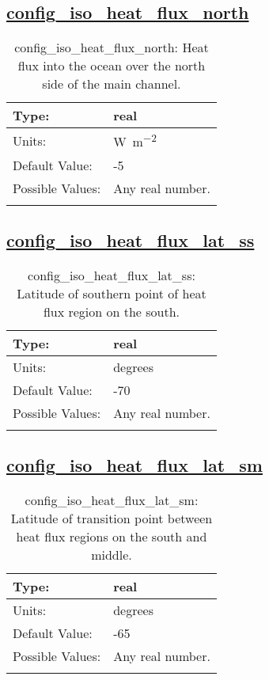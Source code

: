 \subsection[config\_iso\_heat\_flux\_north]{\hyperref[sec:nm_tab_iso]{config\_iso\_heat\_flux\_north}}
\label{subsec:nm_sec_config_iso_heat_flux_north}
\begin{center}
\begin{longtable}{| p{2.0in} || p{4.0in} |}
    \hline
    Type: & real \\
    \hline
    Units: & \si{W.m^{-2}} \\
    \hline
    Default Value: & -5 \\
    \hline
    Possible Values: & Any real number. \\
    \hline
    \caption{config\_iso\_heat\_flux\_north: Heat flux into the ocean over the north side of the main channel.}
\end{longtable}
\end{center}
\subsection[config\_iso\_heat\_flux\_lat\_ss]{\hyperref[sec:nm_tab_iso]{config\_iso\_heat\_flux\_lat\_ss}}
\label{subsec:nm_sec_config_iso_heat_flux_lat_ss}
\begin{center}
\begin{longtable}{| p{2.0in} || p{4.0in} |}
    \hline
    Type: & real \\
    \hline
    Units: & \si{degrees} \\
    \hline
    Default Value: & -70 \\
    \hline
    Possible Values: & Any real number. \\
    \hline
    \caption{config\_iso\_heat\_flux\_lat\_ss: Latitude of southern point of heat flux region on the south.}
\end{longtable}
\end{center}
\subsection[config\_iso\_heat\_flux\_lat\_sm]{\hyperref[sec:nm_tab_iso]{config\_iso\_heat\_flux\_lat\_sm}}
\label{subsec:nm_sec_config_iso_heat_flux_lat_sm}
\begin{center}
\begin{longtable}{| p{2.0in} || p{4.0in} |}
    \hline
    Type: & real \\
    \hline
    Units: & \si{degrees} \\
    \hline
    Default Value: & -65 \\
    \hline
    Possible Values: & Any real number. \\
    \hline
    \caption{config\_iso\_heat\_flux\_lat\_sm: Latitude of transition point between heat flux regions on the south and middle.}
\end{longtable}
\end{center}
